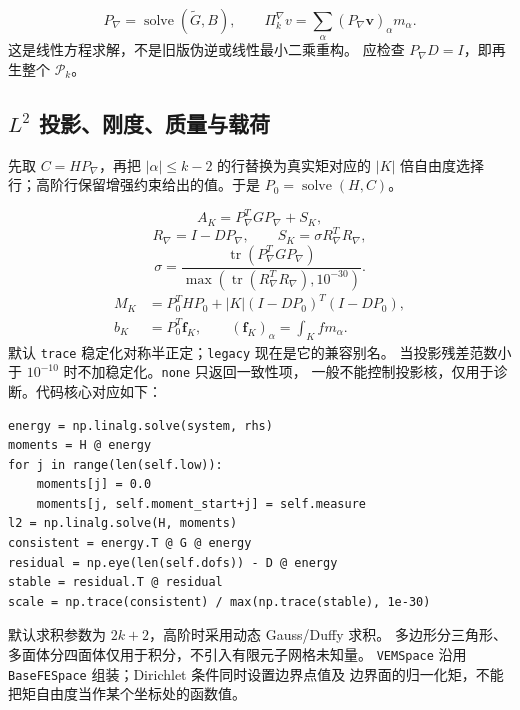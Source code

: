 \documentclass[UTF8,11pt,oneside]{ctexbook}
\theoremstyle{definition}
\theoremstyle{plain}
\newcommand{\code}[1]{\texttt{#1}}
\begin{document}
\begin{equation}
P_\nabla=\operatorname{solve}(\widetilde G,B),\qquad
\Pi_k^\nabla v=\sum_\alpha(P_\nabla\mathbf v)_\alpha m_\alpha.
\label{eq:vem-pi}
\end{equation}
这是线性方程求解，不是旧版伪逆或线性最小二乘重构。
应检查 $P_\nabla D=I$，即再生整个 $\mathcal P_k$。

\subsection{$L^2$ 投影、刚度、质量与载荷}
先取 $C=HP_\nabla$，再把 $|\alpha|\le k-2$ 的行替换为真实矩对应的
$|K|$ 倍自由度选择行；高阶行保留增强约束给出的值。于是 $P_0=\operatorname{solve}(H,C)$。

\begin{equation}
A_K=P_\nabla^TGP_\nabla+S_K,
\label{eq:vem-split}
\end{equation}
\begin{equation}
R_\nabla=I-DP_\nabla,\qquad S_K=\sigma R_\nabla^TR_\nabla,
\label{eq:vem-stab}
\end{equation}
\begin{equation}
\sigma=\frac{\operatorname{tr}(P_\nabla^TGP_\nabla)}
{\max(\operatorname{tr}(R_\nabla^TR_\nabla),10^{-30})}.
\label{eq:vem-sigma}
\end{equation}
\begin{equation}
\begin{split}
M_K&=P_0^THP_0+|K|(I-DP_0)^T(I-DP_0),\\
b_K&=P_0^T\mathbf f_K,\qquad
(\mathbf f_K)_\alpha=\int_K f m_\alpha.
\end{split}
\label{eq:vem-load}
\end{equation}
默认 \code{trace} 稳定化对称半正定；\code{legacy} 现在是它的兼容别名。
当投影残差范数小于 $10^{-10}$ 时不加稳定化。\code{none} 只返回一致性项，
一般不能控制投影核，仅用于诊断。代码核心对应如下：

\begin{lstlisting}[language=MosicaFE,caption={局部投影与稳定化的核心计算}]
energy = np.linalg.solve(system, rhs)
moments = H @ energy
for j in range(len(self.low)):
    moments[j] = 0.0
    moments[j, self.moment_start+j] = self.measure
l2 = np.linalg.solve(H, moments)
consistent = energy.T @ G @ energy
residual = np.eye(len(self.dofs)) - D @ energy
stable = residual.T @ residual
scale = np.trace(consistent) / max(np.trace(stable), 1e-30)
\end{lstlisting}

默认求积参数为 $2k+2$，高阶时采用动态 Gauss/Duffy 求积。
多边形分三角形、多面体分四面体仅用于积分，不引入有限元子网格未知量。
\code{VEMSpace} 沿用 \code{BaseFESpace} 组装；Dirichlet 条件同时设置边界点值及
边界面的归一化矩，不能把矩自由度当作某个坐标处的函数值。
\end{document}
